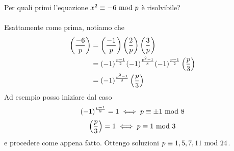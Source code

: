 \begin{esempio}
	Per quali primi l'equazione $x^2\equiv-6\ \mathrm{mod}\ p$ è risolvibile? \\ \\ 
	Esattamente come prima, notiamo che 
	\begin{align*}
	\left(\frac{-6}{p}\right)
	&=\left(\frac{-1}{p}\right)\left(\frac{2}{p}\right)\left(\frac{3}{p}\right)\\
	&=(-1)^{\frac{p-1}{2}}(-1)^{\frac{p^2-1}{8}}(-1)^{\frac{p-1}{2}}\left(\frac{p}{3}\right)\\
	&=(-1)^{\frac{p^2-1}{8}}\left(\frac{p}{3}\right)
	\end{align*}
	Ad esempio posso iniziare dal caso
	\begin{equation*}
	(-1)^{\frac{p-1}{8}}=1 \iff p\equiv\pm1\ \mathrm{mod}\ 8
	\end{equation*}
	\begin{equation*}
	\left(\frac{p}{3}\right)=1 \iff p\equiv1\ \mathrm{mod}\ 3
	\end{equation*}
	e procedere come appena fatto. Ottengo soluzioni $p\equiv1,5,7,11\ \mathrm{mod}\ 24$.
\end{esempio}




